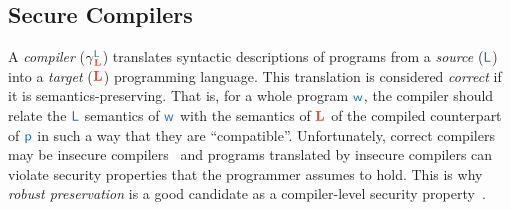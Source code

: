 \subsection{Secure Compilers}\label{subsec:bg:rtp}

A {\em compiler} ($\cc{\src{L}}{\trg{L}}$) translates syntactic descriptions of programs from a {\em source} ($\src{L}$) into a {\em target} ($\trg{L}$) programming language.
This translation is considered {\em correct} if it is semantics-preserving.
That is, for a whole program $\src{\wholeprogvar}$, the compiler should relate the $\src{L}$ semantics of $\src{\wholeprogvar}$ with the semantics of $\trg{L}$ of the compiled counterpart of $\src{p}$ in such a way that they are ``compatible''.
Unfortunately, correct compilers may be insecure compilers~\cite{patrignani2019survey,kennedy2006secure.net,abadi1999protect,ahmed2018dagstuhl} and programs translated by insecure compilers can violate security properties that the programmer assumes to hold.
This is why {\em robust preservation} is a good candidate as a compiler-level security property~\cite{abate2019jour}.

